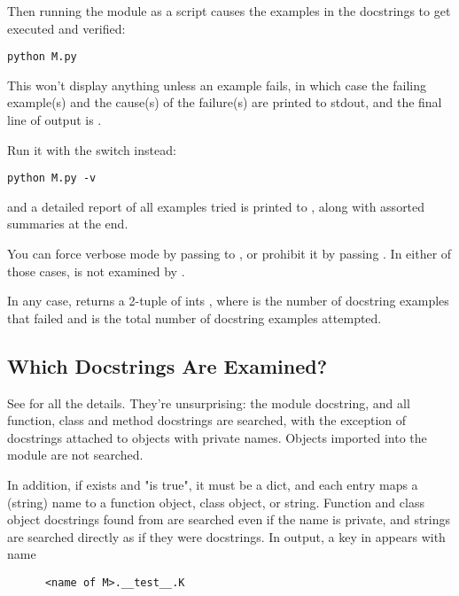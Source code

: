 Then running the module as a script causes the examples in the docstrings
to get executed and verified:

\begin{verbatim}
python M.py
\end{verbatim}

This won't display anything unless an example fails, in which case the
failing example(s) and the cause(s) of the failure(s) are printed to stdout,
and the final line of output is .

Run it with the  switch instead:

\begin{verbatim}
python M.py -v
\end{verbatim}

and a detailed report of all examples tried is printed to ,
along with assorted summaries at the end.

You can force verbose mode by passing  to
, or
prohibit it by passing .  In either of those cases,
 is not examined by .

In any case,  returns a 2-tuple of ints , where  is the number of docstring examples that
failed and  is the total number of docstring examples
attempted.

\subsection{Which Docstrings Are Examined?}

See  for all the details.  They're unsurprising:  the
module docstring, and all function, class and method docstrings are
searched, with the exception of docstrings attached to objects with private
names.  Objects imported into the module are not searched.

In addition, if  exists and "is true", it must be a
dict, and each entry maps a (string) name to a function object, class
object, or string.  Function and class object docstrings found from
 are searched even if the name is private, and
strings are searched directly as if they were docstrings.  In output,
a key  in  appears with name

\begin{verbatim}
      <name of M>.__test__.K
\end{verbatim}

